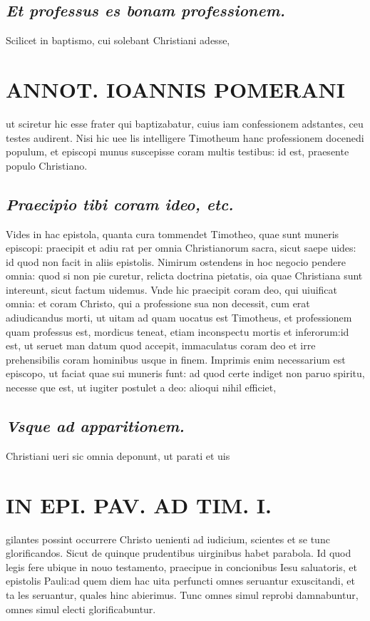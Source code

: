 \documentclass{article}
\begin{document}
\begin{pages}
\subsection*{\textit{Et professus es bonam professionem. }}\pstart Scilicet in baptismo, cui solebant Christiani adesse,  \pend
\section*{ANNOT. IOANNIS POMERANI }\pstart ut sciretur hic esse frater qui baptizabatur, cuius iam confessionem adstantes, ceu testes audirent. Nisi hic uee lis intelligere Timotheum hanc professionem docenedi populum, et episcopi munus suscepisse coram multis testibus: id est, praesente populo Christiano.  \pend
{}
{}
\subsection*{\textit{Praecipio tibi coram ideo, etc. }}\pstart Vides in hac epistola, quanta cura tommendet Timotheo, quae sunt muneris episcopi: praecipit et adiu rat per omnia Christianorum sacra, sicut saepe uides: id quod non facit in aliis epistolis. Nimirum ostendens in hoc negocio pendere omnia: quod si non pie curetur, relicta doctrina pietatis, oia quae Christiana sunt intereunt, sicut factum uidemus. Vnde hic praecipit coram deo, qui uiuificat omnia: et coram Christo, qui a professione sua non decessit, cum erat adiudicandus morti, ut uitam ad quam uocatus est Timotheus, et professionem quam professus est, mordicus teneat, etiam inconspectu mortis et inferorum:id est, ut seruet man datum quod accepit, immaculatus coram deo et irre prehensibilis coram hominibus usque in finem. Imprimis enim necessarium est episcopo, ut faciat quae sui muneris funt: ad quod certe indiget non paruo spiritu, necesse que est, ut iugiter postulet a deo: alioqui nihil efficiet,  \pend
{}
{}
\subsection*{\textit{Vsque ad apparitionem. }}\pstart Christiani ueri sic omnia deponunt, ut parati et uis  \pend
\section*{IN EPI. PAV. AD TIM. I. }\pstart gilantes possint occurrere Christo uenienti ad iudicium, scientes et se tunc glorificandos. Sicut de quinque  prudentibus uirginibus habet parabola. Id quod legis fere ubique in nouo testamento, praecipue in concionibus Iesu saluatoris, et epistolis Pauli:ad quem diem hac uita perfuncti omnes seruantur exuscitandi, et ta les seruantur, quales hinc abierimus. Tunc omnes simul reprobi damnabuntur, omnes simul electi glorificabuntur.  \pend
{}
{}

\end{pages}
\end{document}
